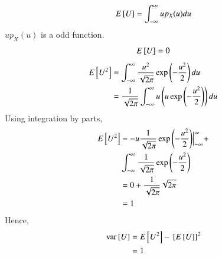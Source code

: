 \documentclass[journal,12pt,twocolumn]{IEEEtran}
\renewcommand\thesection{\arabic{section}}
\begin{document}
\begin{enumerate}[label=\thesection.\arabic*
,ref=\thesection.\theenumi]
\solution

\begin{align}
E{}\left[U\right] &= \int_{-\infty}^{\infty} up_X(u) du \\
\end{align}
$up_X(u)$ is a odd function.
\begin{align}
E{}\left[U\right] &= 0 \\
\end{align}
\begin{align}
E{}\left[U^2\right] &= \int_{-\infty}^{\infty} \frac{u^2}{\sqrt{2\pi}}\exp\left(-\frac{u^2}{2}\right) du \\
&= \frac{1}{\sqrt{2\pi}} \int_{-\infty}^{\infty} u\left(u\exp\left(-\frac{u^2}{2}\right)\right)du
\end{align}
Using integration by parts,
\begin{align}
E{}\left[U^2\right] &= -u\frac{1}{\sqrt{2\pi}}\exp{\ensuremath{\left(-\frac{u^2}{2}\right)}}\Big|_{-\infty}^{\infty}  + \nonumber \\ 
& \int_{-\infty}^{\infty} \frac{1}{\sqrt{2\pi}}\exp\left(-\frac{u^2}{2}\right)  \\ 
                &= 0 + \frac{1}{\sqrt{2\pi}}\sqrt{2\pi} \\
                &= 1
\end{align}
Hence,
\begin{align}
\text{var}{}\left[U\right] &= E{}\left[U^2\right] - {}\left[E{}\left[U\right]\right]^2 \\
&= 1
\end{align}
%
\end{enumerate}
\end{document}
